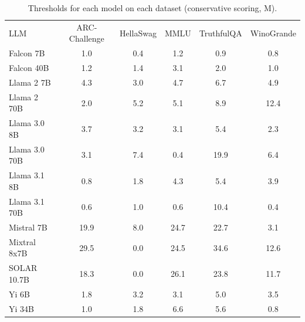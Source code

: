 \begin{table}[h]
\caption{Thresholds for each model on each dataset (conservative scoring, M). }
\label{tab:thresholds_logit_margin_k20_w2}
\centering
\begin{tabular}{l S[table-format=3.1] S[table-format=3.1] S[table-format=3.1] S[table-format=3.1] S[table-format=3.1]}
\toprule
LLM & ARC-Challenge & HellaSwag & MMLU & TruthfulQA & WinoGrande \\ 
\cmidrule(lr){1-1} \cmidrule(lr){2-2} \cmidrule(lr){3-3} \cmidrule(lr){4-4} \cmidrule(lr){5-5} \cmidrule(lr){6-6}
Falcon 7B & 1.0 & 0.4 & 1.2 & 0.9 & 0.8\\
Falcon 40B & 1.2 & 1.4 & 3.1 & 2.0 & 1.0\\
Llama 2 7B & 4.3 & 3.0 & 4.7 & 6.7 & 4.9\\
Llama 2 70B & 2.0 & 5.2 & 5.1 & 8.9 & 12.4\\
Llama 3.0 8B & 3.7 & 3.2 & 3.1 & 5.4 & 2.3\\
Llama 3.0 70B & 3.1 & 7.4 & 0.4 & 19.9 & 6.4\\
Llama 3.1 8B & 0.8 & 1.8 & 4.3 & 5.4 & 3.9\\
Llama 3.1 70B & 0.6 & 1.0 & 0.6 & 10.4 & 0.4\\
Mistral 7B & 19.9 & 8.0 & 24.7 & 22.7 & 3.1\\
Mixtral 8x7B & 29.5 & 0.0 & 24.5 & 34.6 & 12.6\\
SOLAR 10.7B & 18.3 & 0.0 & 26.1 & 23.8 & 11.7\\
Yi 6B & 1.8 & 3.2 & 3.1 & 5.0 & 3.5\\
Yi 34B & 1.0 & 1.8 & 6.6 & 5.6 & 0.8\\
\bottomrule
\end{tabular}
\end{table}
